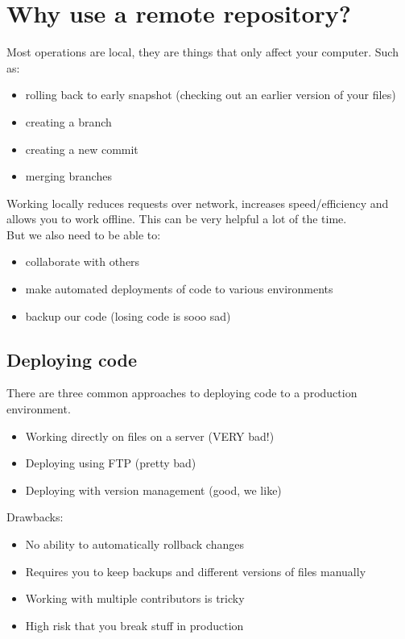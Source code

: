 \section{Why use a remote repository?}

Most operations are local, they are things that only affect your computer. Such as:

\begin{itemize}
    \item rolling back to early snapshot (checking out an earlier version of your files)
    \item creating a branch
    \item creating a new commit
    \item merging branches
\end{itemize}

Working locally reduces requests over network, increases speed/efficiency and allows you to work offline. This can be very helpful a lot of the time.
\\

But we also need to be able to:

\begin{itemize}
    \item collaborate with others
    \item make automated deployments of code to various environments
    \item backup our code (losing code is sooo sad)
\end{itemize}


\subsection{Deploying code}

There are three common approaches to deploying code to a production environment.

\begin{itemize}
    \item Working directly on files on a server (VERY bad!)
    \item Deploying using FTP (pretty bad)
    \item Deploying with version management (good, we like)
\end{itemize}



Drawbacks:
\begin{itemize}
    \item No ability to automatically rollback changes
    \item Requires you to keep backups and different versions of files manually
    \item Working with multiple contributors is tricky
	\item High risk that you break stuff in production
\end{itemize}


